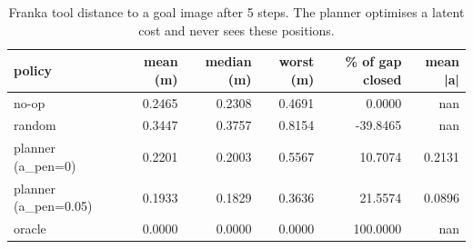 \begin{table}[t]
\centering
\begin{tabular}{lrrrrr}
\toprule
policy & mean (m) & median (m) & worst (m) & \% of gap closed & mean |a| \\
\midrule
no-op & 0.2465 & 0.2308 & 0.4691 & 0.0000 & nan \\
random & 0.3447 & 0.3757 & 0.8154 & -39.8465 & nan \\
planner (a\_pen=0) & 0.2201 & 0.2003 & 0.5567 & 10.7074 & 0.2131 \\
planner (a\_pen=0.05) & 0.1933 & 0.1829 & 0.3636 & 21.5574 & 0.0896 \\
oracle & 0.0000 & 0.0000 & 0.0000 & 100.0000 & nan \\
\bottomrule
\end{tabular}
\caption{Franka tool distance to a goal image after 5 steps. The planner optimises a latent cost and never sees these positions.}
\label{tab:franka-planning}
\end{table}

